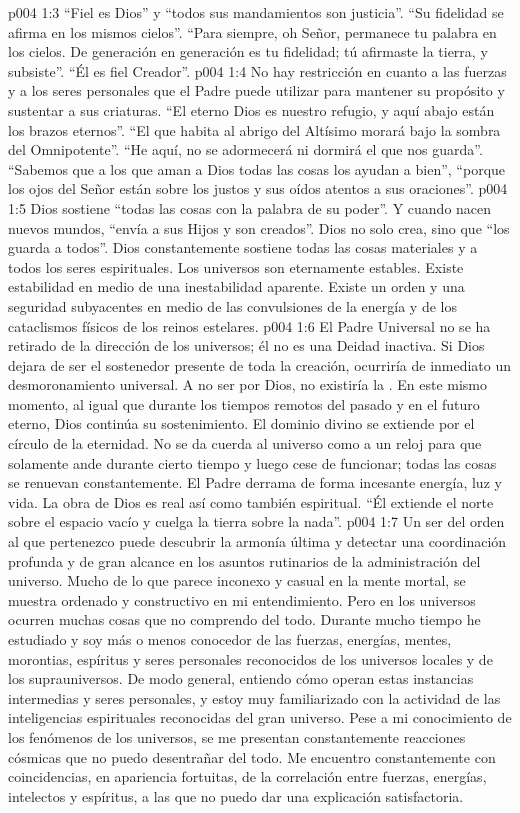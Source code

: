 \vs p004 1:3 “Fiel es Dios” y “todos sus mandamientos son justicia”. “Su fidelidad se afirma en los mismos cielos”. “Para siempre, oh Señor, permanece tu palabra en los cielos. De generación en generación es tu fidelidad; tú afirmaste la tierra, y subsiste”. “Él es fiel Creador”.
\vs p004 1:4 No hay restricción en cuanto a las fuerzas y a los seres personales que el Padre puede utilizar para mantener su propósito y sustentar a sus criaturas. “El eterno Dios es nuestro refugio, y aquí abajo están los brazos eternos”. “El que habita al abrigo del Altísimo morará bajo la sombra del Omnipotente”. “He aquí, no se adormecerá ni dormirá el que nos guarda”. “Sabemos que a los que aman a Dios todas las cosas los ayudan a bien”, “porque los ojos del Señor están sobre los justos y sus oídos atentos a sus oraciones”.
\vs p004 1:5 Dios sostiene “todas las cosas con la palabra de su poder”. Y cuando nacen nuevos mundos, “envía a sus Hijos y son creados”. Dios no solo crea, sino que “los guarda a todos”. Dios constantemente sostiene todas las cosas materiales y a todos los seres espirituales. Los universos son eternamente estables. Existe estabilidad en medio de una inestabilidad aparente. Existe un orden y una seguridad subyacentes en medio de las convulsiones de la energía y de los cataclismos físicos de los reinos estelares.
\vs p004 1:6 El Padre Universal no se ha retirado de la dirección de los universos; él no es una Deidad inactiva. Si Dios dejara de ser el sostenedor presente de toda la creación, ocurriría de inmediato un desmoronamiento universal. A no ser por Dios, no existiría la . En este mismo momento, al igual que durante los tiempos remotos del pasado y en el futuro eterno, Dios continúa su sostenimiento. El dominio divino se extiende por el círculo de la eternidad. No se da cuerda al universo como a un reloj para que solamente ande durante cierto tiempo y luego cese de funcionar; todas las cosas se renuevan constantemente. El Padre derrama de forma incesante energía, luz y vida. La obra de Dios es real así como también espiritual. “Él extiende el norte sobre el espacio vacío y cuelga la tierra sobre la nada”.
\vs p004 1:7 \pc Un ser del orden al que pertenezco puede descubrir la armonía última y detectar una coordinación profunda y de gran alcance en los asuntos rutinarios de la administración del universo. Mucho de lo que parece inconexo y casual en la mente mortal, se muestra ordenado y constructivo en mi entendimiento. Pero en los universos ocurren muchas cosas que no comprendo del todo. Durante mucho tiempo he estudiado y soy más o menos conocedor de las fuerzas, energías, mentes, morontias, espíritus y seres personales reconocidos de los universos locales y de los suprauniversos. De modo general, entiendo cómo operan estas instancias intermedias y seres personales, y estoy muy familiarizado con la actividad de las inteligencias espirituales reconocidas del gran universo. Pese a mi conocimiento de los fenómenos de los universos, se me presentan constantemente reacciones cósmicas que no puedo desentrañar del todo. Me encuentro constantemente con coincidencias, en apariencia fortuitas, de la correlación entre fuerzas, energías, intelectos y espíritus, a las que no puedo dar una explicación satisfactoria.

